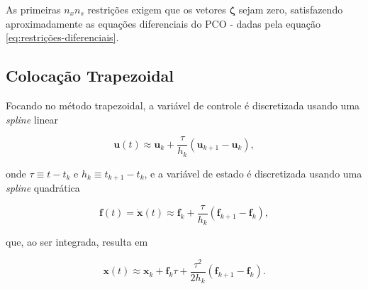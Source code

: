 As primeiras $n_x n_s$ restrições exigem que os vetores $\boldsymbol{\zeta}$ sejam zero, satisfazendo aproximadamente as equações diferenciais do PCO - dadas pela equação \ref{eq:restrições-diferenciais}.


\subsection{Colocação Trapezoidal}
\label{subsec:colocacao-trapezoidal}

Focando no método trapezoidal, a variável de controle é discretizada usando uma \textit{spline} linear 

\begin{equation}
    \mathbf{u}(t) \approx \mathbf{u}_k + \dfrac{\tau}{h_k} (\mathbf{u}_{k+1} - \mathbf{u}_k),
\end{equation}

\noindent onde $\tau \equiv t - t_k$ e $h_k \equiv t_{k+1} - t_k$, e a variável de estado é discretizada usando uma \textit{spline} quadrática

\begin{equation}
    \mathbf{f}(t) = \dot{\mathbf{x}}(t) \approx \mathbf{f}_k + \dfrac{\tau}{h_k} (\mathbf{f}_{k+1} - \mathbf{f}_k),
\end{equation}

\noindent que, ao ser integrada, resulta em

\begin{equation}
    \mathbf{x}(t) \approx \mathbf{x}_k + \mathbf{f}_k \tau + \dfrac{\tau^2}{2h_k} (\mathbf{f}_{k+1} - \mathbf{f}_k).
    \label{eq:spline-quadratica}
\end{equation}

